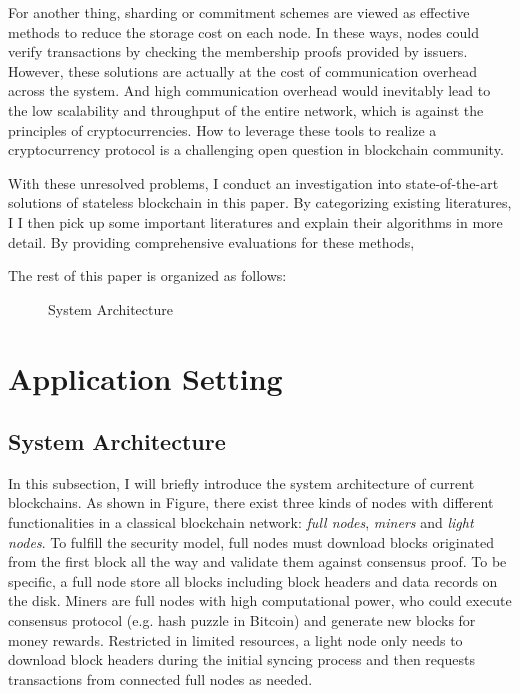 \documentclass[conference]{IEEEtran}
\begin{document}
For another thing, sharding or commitment schemes are viewed as effective methods to reduce the storage cost on each node.
%
In these ways, nodes could verify transactions by checking the membership proofs provided by issuers.
%
However, these solutions are actually at the cost of communication overhead across the system.
%
And high communication overhead would inevitably lead to the low scalability and throughput of the entire network, which is against the principles of cryptocurrencies.
%
How to leverage these tools to realize a cryptocurrency protocol is a challenging open question in blockchain community.

With these unresolved problems, I conduct an investigation into state-of-the-art solutions of stateless blockchain in this paper.
%
By categorizing existing literatures, I
%
I then pick up some important literatures and explain their algorithms in more detail.
%
By providing comprehensive evaluations for these methods, 

The rest of this paper is organized as follows: 


\begin{figure}[t]
  \centering
  \resizebox{0.7\linewidth}{!}{}
  \caption{System Architecture}\label{fig:model}
\end{figure}

\section{Application Setting}
\subsection{System Architecture}
In this subsection, I will briefly introduce the system architecture of current blockchains.
%
As shown in Figure, there exist three kinds of nodes with different functionalities in a classical blockchain network:
\textit{full nodes}, \textit{miners} and \textit{light nodes}.
%
To fulfill the security model, full nodes must download blocks originated from the first block all the way and validate them against consensus proof.
%
To be specific, a full node store all blocks including block headers and data records on the disk.
%
Miners are full nodes with high computational power, who could execute consensus protocol (e.g. hash puzzle in Bitcoin) and generate new blocks for money rewards.
%
Restricted in limited resources, a light node only needs to download block headers during the initial syncing process and then requests transactions from connected full nodes as needed.
\end{document}
